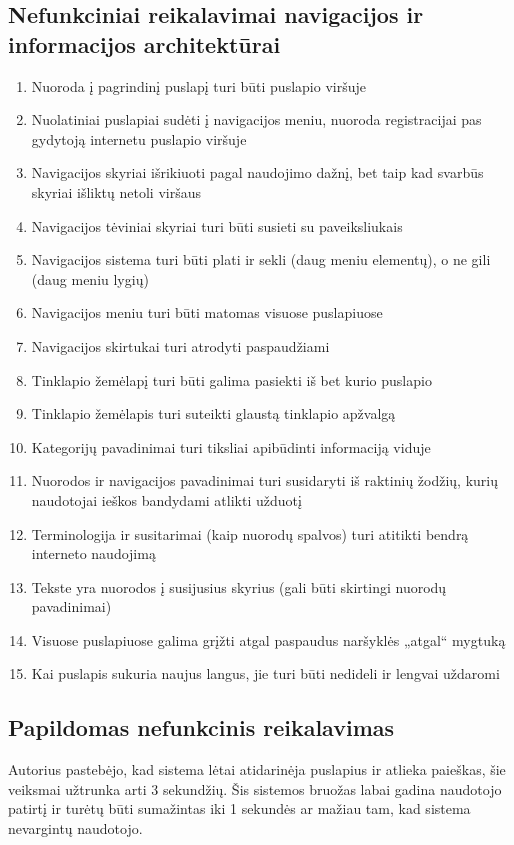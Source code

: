 \documentclass{VUMIFPSkursinis}
\begin{document}
\subsection{Nefunkciniai reikalavimai navigacijos ir informacijos architektūrai}
\begin{enumerate}
	\item Nuoroda į pagrindinį puslapį turi būti puslapio viršuje
	\item Nuolatiniai puslapiai sudėti į navigacijos meniu, nuoroda registracijai pas gydytoją internetu puslapio viršuje
	\item Navigacijos skyriai išrikiuoti pagal naudojimo dažnį, bet taip kad svarbūs skyriai išliktų netoli viršaus
	\item Navigacijos tėviniai skyriai turi būti susieti su paveiksliukais
	\item Navigacijos sistema turi būti plati ir sekli (daug meniu elementų), o ne gili (daug meniu lygių)
	\item Navigacijos meniu turi būti matomas visuose puslapiuose
	\item Navigacijos skirtukai turi atrodyti paspaudžiami
	\item Tinklapio žemėlapį turi būti galima pasiekti iš bet kurio puslapio
	\item Tinklapio žemėlapis turi suteikti glaustą tinklapio apžvalgą
	\item Kategorijų pavadinimai turi tiksliai apibūdinti informaciją viduje
	\item Nuorodos ir navigacijos pavadinimai turi susidaryti iš raktinių žodžių, kurių naudotojai ieškos bandydami atlikti užduotį
	\item Terminologija ir susitarimai (kaip nuorodų spalvos) turi atitikti bendrą interneto naudojimą
	\item Tekste yra nuorodos į susijusius skyrius (gali būti skirtingi nuorodų pavadinimai)
	\item Visuose puslapiuose galima grįžti atgal paspaudus naršyklės „atgal“ mygtuką
	\item Kai puslapis sukuria naujus langus, jie turi būti nedideli ir lengvai uždaromi
\end{enumerate}

\subsection{Papildomas nefunkcinis reikalavimas}
Autorius pastebėjo, kad sistema lėtai atidarinėja puslapius ir atlieka paieškas, šie veiksmai užtrunka arti 3 sekundžių. Šis sistemos bruožas labai gadina naudotojo patirtį ir turėtų būti sumažintas iki 1 sekundės ar mažiau tam, kad sistema nevargintų naudotojo.
\end{document}
